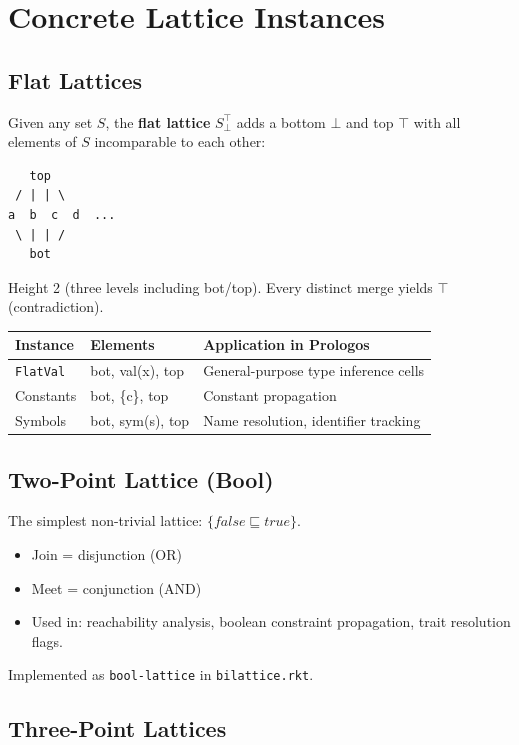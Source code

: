 \documentclass[11pt]{article}
\begin{document}
\section{Concrete Lattice Instances}
\label{sec:org4f95acd}

\subsection{Flat Lattices}
\label{sec:org6c7b590}

Given any set \(S\), the \textbf{flat lattice} \(S_\bot^\top\) adds a bottom \(\bot\) and top
\(\top\) with all elements of \(S\) incomparable to each other:

\begin{verbatim}
   top
 / | | \
a  b  c  d  ...
 \ | | /
   bot
\end{verbatim}

Height 2 (three levels including bot/top). Every distinct merge yields \(\top\)
(contradiction).

\begin{center}
\begin{tabular}{lll}
Instance & Elements & Application in Prologos\\
\hline
\texttt{FlatVal} & bot, val(x), top & General-purpose type inference cells\\
Constants & bot, \{c\}, top & Constant propagation\\
Symbols & bot, sym(s), top & Name resolution, identifier tracking\\
\end{tabular}
\end{center}
\subsection{Two-Point Lattice (Bool)}
\label{sec:orgc223161}

The simplest non-trivial lattice: \(\{false \sqsubseteq true\}\).

\begin{itemize}
\item Join = disjunction (OR)
\item Meet = conjunction (AND)
\item Used in: reachability analysis, boolean constraint propagation, trait
resolution flags.
\end{itemize}

Implemented as \texttt{bool-lattice} in \texttt{bilattice.rkt}.
\subsection{Three-Point Lattices}
\label{sec:org004782b}
\end{document}

